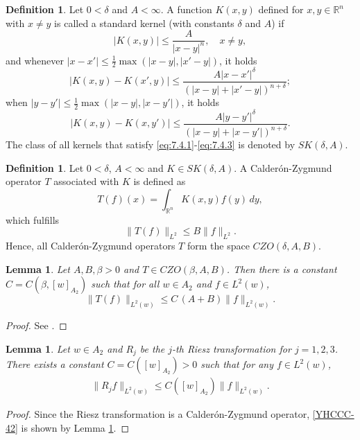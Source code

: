 \documentclass[11pt,twoside]{article}
\newcommand{\Ltw}[1]{\|#1\|_{L^2(w)}}
\newcommand{\Atwo}[1]{[#1]_{A_2}}
\newcommand{\Rj}[1]{R_{#1}}
\theoremstyle{plain}
\newtheorem{lemma}[theorem]{Lemma}
\theoremstyle{definition}
\newtheorem{definition}[theorem]{Definition}
\theoremstyle{assumption}
\numberwithin{equation}{section}
\begin{document}
	
	\begin{definition}\label{def:7.4.1}
		Let $0 < \delta$ and $A < \infty$. A function $K(x,y)$ defined for $x,y \in \mathbb{R}^n$ with $x \neq y$ is called a standard kernel (with constants $\delta$ and $A$) if
		\begin{equation}\label{eq:7.4.1}
			|K(x,y)| \leq \frac{A}{|x-y|^n}, \quad x \neq y,
		\end{equation}
		and whenever $|x-x'| \leq \frac12\max\left(|x-y|,|x'-y|\right)$, it holds
		\begin{equation}\label{eq:7.4.2}
			|K(x,y) - K(x',y)| \leq \frac{A|x-x'|^\delta}{\left(|x-y|+|x'-y|\right)^{n+\delta}};
		\end{equation}
		when $|y-y'| \leq \frac12\max\left(|x-y|,|x-y'|\right)$, it holds
		\begin{equation}\label{eq:7.4.3}
			|K(x,y) - K(x,y')| \leq \frac{A|y-y'|^\delta}{\left(|x-y|+|x-y'|\right)^{n+\delta}}.
		\end{equation}
		The class of all kernels that satisfy \eqref{eq:7.4.1}-\eqref{eq:7.4.3} is denoted by $SK(\delta,A)$.
	\end{definition}
	
	
	\begin{definition}\label{def:7.4.2}
		Let $0 < \delta$, $A < \infty$ and $K\in SK(\delta,A)$. A Calder\'{o}n-Zygmund operator $T$ associated with $K$ is defined as
		\begin{equation}\label{eq:7.4.5}
			T(f)(x) = \int_{\mathbb{R}^n} K(x,y)f(y)\,dy,
		\end{equation}
		which fulfills
		\begin{equation}\label{eq:7.4.4}
			\|T(f)\|_{L^2} \leq B\|f\|_{L^2}.
		\end{equation}
		Hence, all Calder\'{o}n-Zygmund operators $T$ form the space $CZO(\delta,A,B)$.
	\end{definition}
	\begin{lemma}\label{lem:A2}
		Let $A,B,\beta > 0$ and $T\in CZO(\beta,A,B)$. Then there is a constant $C = C(\beta,[w]_{A_2})$ such that
		for all $w \in A_2$ and $f \in L^2(w)$,
		\[
		\|T(f)\|_{L^2(w)} \leq C\,(A+B)\|f\|_{L^2(w)}.
		\]
	\end{lemma}
	\begin{proof}
		See \cite[Theorem 7.4.6]{Grafakos}.
	\end{proof}
	\begin{lemma}\label{lem:riesz L2}
		Let $w \in A_2$ and $\Rj{j}$ be the $j$-th Riesz transformation for $j = 1, 2, 3$. There exists a constant $C = C (\Atwo{w})> 0$ such that
		for any $f \in L^2(w)$,
		\begin{equation}\label{YHCCC-42}
			\begin{aligned}
				\Ltw{\Rj{j}f} \leq C (\Atwo{w}) \Ltw{f}.
			\end{aligned}
		\end{equation}
	\end{lemma}
	\begin{proof}
		Since the Riesz transformation is a Calder\'on-Zygmund operator, \eqref{YHCCC-42} is shown by Lemma \ref{lem:A2}.
	\end{proof}
	
\end{document}

